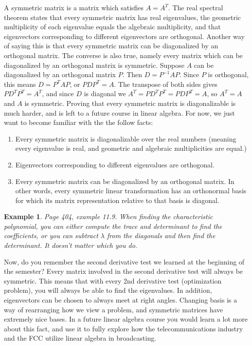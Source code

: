 \documentclass[10pt]{article}
\theoremstyle{plain}
\theoremstyle{box}
\newtheorem{example}{Example}
\begin{document}
A symmetric matrix is a matrix which satisfies $A=A^T$. The real spectral theorem states that every symmetric matrix has real eigenvalues, the geometric multiplicity of each eigenvalue equals the algebraic multiplicity, and that eigenvectors corresponding to different eigenvectors are orthogonal.    Another way of saying this is that every symmetric matrix can be diagonalized by an orthogonal matrix.  The converse is also true, namely every matrix which can be diagonalized by an orthogonal matrix is symmetric.  Suppose $A$ can be diagonalized by an orthogonal matrix $P$.  Then $D=P^{-1}AP$.  Since $P$ is orthogonal, this means $D=P^TAP$, or $PDP^T=A$.  The transpose of both sides gives $PD^TP^T=A^T$, and since $D$ is diagonal we $A^T=PD^TP^T=PDP^T=A$, so $A^T=A$ and $A$ is symmetric.  Proving that every symmetric matrix is diagonalizable is much harder, and is left to a future course in linear algebra.  For now, we just want to become familiar with the the follow facts:
\begin{enumerate}
	\item Every symmetric matrix is diagonalizable over the real numbers (meaning every eigenvalue is real, and geometric and algebraic multiplicities are equal.)
	\item Eigenvectors corresponding to different eigenvalues are orthogonal.
	\item Every symmetric matrix can be diagonalized by an orthogonal matrix. In other words, every symmetric linear transformation has an orthonormal basis for which its matrix representation relative to that basis is diagonal.
\end{enumerate}

\begin{example}
Page 404, example 11.9.  When finding the characteristic polynomial, you can either compute the trace and determinant to find the coefficients, or you can subtract $\lambda$ from the diagonals and then find the determinant.  It doesn't matter which you do.
\end{example}

Now, do you remember the second derivative test we learned at the beginning of the semester?  Every matrix involved in the second derivative test will always be symmetric.  This means that with every 2nd derivative test (optimization problem), you will always be able to find the eigenvalues.  In addition, eigenvectors can be chosen to always meet at right angles. Changing basis is a way of rearranging how we view a problem, and symmetric matrices have extremely nice bases.  In a future linear algebra course you would learn a lot more about this fact, and use it to fully explore how the telecommunications industry and the FCC utilize linear algebra in broadcasting.
\end{document}
